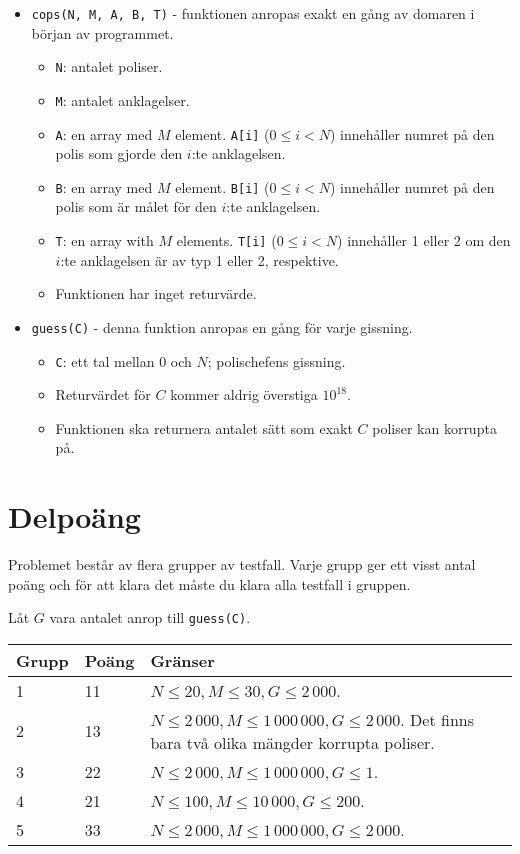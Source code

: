 \begin{itemize}
  \item \texttt{cops(N, M, A, B, T)} - funktionen anropas exakt en gång av domaren i början av programmet.
  \begin{itemize}
    \item \texttt{N}: antalet poliser.
    \item \texttt{M}: antalet anklagelser.
    \item \texttt{A}: en array med $M$ element. \texttt{A[i]} ($0 \le i < N$) innehåller numret på den polis som gjorde den $i$:te anklagelsen.
    \item \texttt{B}: en array med $M$ element. \texttt{B[i]} ($0 \le i < N$) innehåller numret på den polis som är målet för den $i$:te anklagelsen.
    \item \texttt{T}: en array with $M$ elements. \texttt{T[i]} ($0 \le i < N$) innehåller 1 eller 2 om den $i$:te anklagelsen är av typ 1 eller 2, respektive.
		\item Funktionen har inget returvärde.
  \end{itemize}
\end{itemize}

\begin{itemize}
  \item \texttt{guess(C)} - denna funktion anropas en gång för varje gissning.
  \begin{itemize}
    \item \texttt{C}: ett tal mellan $0$ och $N$; polischefens gissning.
    \item Returvärdet för $C$ kommer aldrig överstiga $10^{18}$.
		\item Funktionen ska returnera antalet sätt som exakt $C$ poliser kan korrupta på.
  \end{itemize}
\end{itemize}

\section*{Delpoäng}
Problemet består av flera grupper av testfall. Varje grupp ger ett visst antal poäng och för att klara det måste du klara alla testfall i gruppen.

Låt $G$ vara antalet anrop till \texttt{guess(C)}.
\begin{tabular}{|l|l|l|}
  \hline
  \textbf{Grupp} & \textbf{Poäng} & \textbf{Gränser} \\ \hline
  1 & 11 & $N \le 20, M \le 30, G \le 2\,000$. \\ \hline
  2 & 13 & $N \le 2\,000, M \le 1\,000\,000, G \le 2\,000$. Det finns bara två olika mängder korrupta poliser. \\ \hline
  3 & 22 & $N \le 2\,000, M \le 1\,000\,000, G \le 1$. \\ \hline
  4 & 21 & $N \le 100, M \le 10\,000, G \le 200$. \\ \hline
  5 & 33 & $N \le 2\,000, M \le 1\,000\,000, G \le 2\,000$. \\ \hline
\end{tabular}

